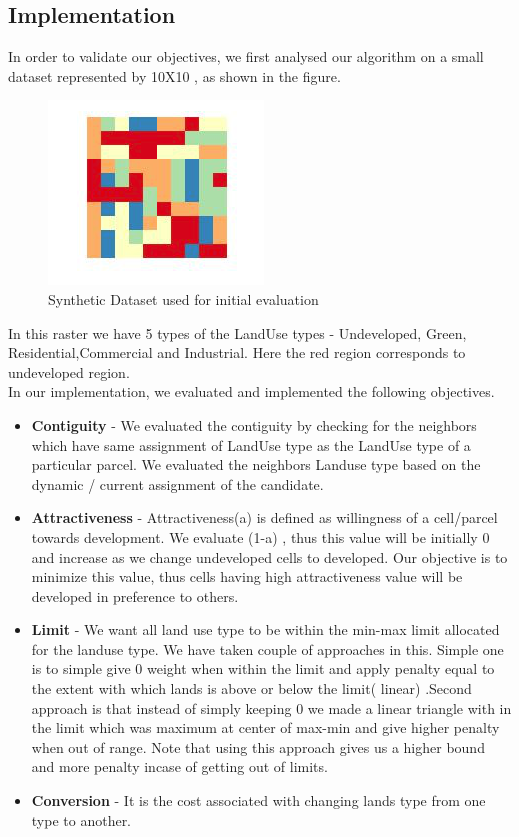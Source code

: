 \documentclass[twoside,10pt]{article}
\begin{document}
\subsection{Implementation}
In order to validate our objectives, we first analysed our algorithm on a small dataset represented by 10X10  , as shown in the figure.
\begin{figure}[h]
\begin{center}
\includegraphics[width=3.in]{orig.png}
\caption{Synthetic Dataset used for initial evaluation}
\end{center}
\end{figure}
In this raster we have 5 types of the LandUse types - Undeveloped, Green, Residential,Commercial and Industrial. 
Here the red region corresponds to undeveloped region.\\
In our implementation, we evaluated and implemented the following objectives. 
\begin{itemize}
\item \textbf{Contiguity} - We evaluated the contiguity by checking for the neighbors which have same assignment of LandUse type as the LandUse type of a particular parcel. We evaluated the neighbors Landuse type based  on the dynamic / current assignment of the candidate.
\item \textbf{Attractiveness} - Attractiveness(a) is defined as willingness of a cell/parcel towards development. We evaluate (1-a) , thus this value will be initially 0 and increase as we change undeveloped cells to developed. Our objective is to minimize this value, thus cells having high attractiveness value will be developed in preference to others.
\item \textbf{Limit} - We want all land use type to be within the min-max limit allocated for the landuse type. We have taken couple of approaches in this. Simple one is to simple give 0 weight when within the limit and apply penalty equal to the extent with which lands is above or below the limit( linear) .Second approach is that instead of simply keeping 0 we made a linear triangle with in the limit which was maximum at center of max-min and give higher penalty when out of range. Note that using this approach gives us a higher bound and more penalty incase of getting out of limits. 
\item \textbf{Conversion} - It is the cost associated with changing lands type from one type to another. \\
\end{itemize}
\end{document}

